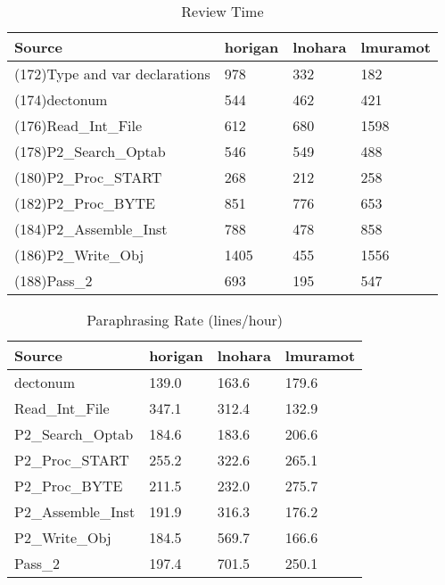 \begin{table}[hb]
\begin{center}
\begin{tabular}{|l|l|l|l|}
\hline
Source & horigan & lnohara & lmuramot\\
\hline
(172)Type and var declarations & 978 & 332 & 182\\
(174)dectonum & 544 & 462 & 421\\
(176)Read\_Int\_File & 612 & 680 & 1598\\
(178)P2\_Search\_Optab & 546 & 549 & 488\\
(180)P2\_Proc\_START & 268 & 212 & 258\\
(182)P2\_Proc\_BYTE & 851 & 776 & 653\\
(184)P2\_Assemble\_Inst & 788 & 478 & 858\\
(186)P2\_Write\_Obj & 1405 & 455 & 1556\\
(188)Pass\_2 & 693 & 195 & 547\\
\hline
\end{tabular}
\end{center}
\caption{Review Time}
\end{table}

\begin{table}[hb]
\begin{center}
\begin{tabular}{|l|l|l|l|}
\hline
Source & horigan & lnohara & lmuramot\\
\hline
dectonum & 139.0 & 163.6 & 179.6\\
Read\_Int\_File & 347.1 & 312.4 & 132.9\\
P2\_Search\_Optab & 184.6 & 183.6 & 206.6\\
P2\_Proc\_START & 255.2 & 322.6 & 265.1\\
P2\_Proc\_BYTE & 211.5 & 232.0 & 275.7\\
P2\_Assemble\_Inst & 191.9 & 316.3 & 176.2\\
P2\_Write\_Obj & 184.5 & 569.7 & 166.6\\
Pass\_2 & 197.4 & 701.5 & 250.1\\
\hline
\end{tabular}
\end{center}
\caption{Paraphrasing Rate (lines/hour)}
\end{table}


